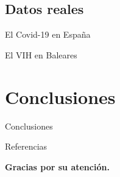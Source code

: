 \subsection{Datos reales}


\begin{frame}{El Covid-19 en España}

\end{frame}


\begin{frame}{El VIH en Baleares}

\end{frame}




\section{Conclusiones}


\begin{frame}{Conclusiones}

\end{frame}



\begin{frame}{Referencias}
    
    
\end{frame}


\begin{frame}[c]{}
\begin{center}
\large{\textbf{Gracias por su atención.}}
\end{center}
\end{frame}
